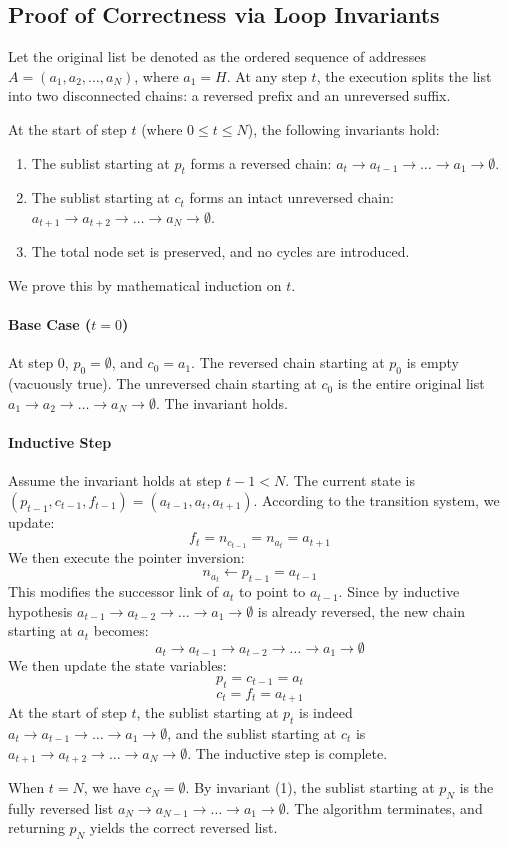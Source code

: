 \documentclass[10pt,journal,compsoc]{IEEEtran}
\begin{document}
\subsection{Proof of Correctness via Loop Invariants}
Let the original list be denoted as the ordered sequence of addresses $A = (a_1, a_2, \dots, a_N)$, where $a_1 = H$. At any step $t$, the execution splits the list into two disconnected chains: a reversed prefix and an unreversed suffix.
\begin{lemma}
At the start of step $t$ (where $0 \le t \le N$), the following invariants hold:
\begin{enumerate}
\item The sublist starting at $p_t$ forms a reversed chain: $a_t \to a_{t-1} \to \dots \to a_1 \to \emptyset$.
\item The sublist starting at $c_t$ forms an intact unreversed chain: $a_{t+1} \to a_{t+2} \to \dots \to a_N \to \emptyset$.
\item The total node set is preserved, and no cycles are introduced.
\end{enumerate}
\end{lemma}

\begin{IEEEproof}
We prove this by mathematical induction on $t$.
\paragraph{Base Case ($t=0$)}
At step $0$, $p_0 = \emptyset$, and $c_0 = a_1$. The reversed chain starting at $p_0$ is empty (vacuously true). The unreversed chain starting at $c_0$ is the entire original list $a_1 \to a_2 \to \dots \to a_N \to \emptyset$. The invariant holds.

\paragraph{Inductive Step}
Assume the invariant holds at step $t-1 < N$. The current state is $(p_{t-1}, c_{t-1}, f_{t-1}) = (a_{t-1}, a_t, a_{t+1})$. 
According to the transition system, we update:
\[ f_t = n_{c_{t-1}} = n_{a_t} = a_{t+1} \]
We then execute the pointer inversion:
\[ n_{a_t} \leftarrow p_{t-1} = a_{t-1} \]
This modifies the successor link of $a_t$ to point to $a_{t-1}$. Since by inductive hypothesis $a_{t-1} \to a_{t-2} \to \dots \to a_1 \to \emptyset$ is already reversed, the new chain starting at $a_t$ becomes:
\[ a_t \to a_{t-1} \to a_{t-2} \to \dots \to a_1 \to \emptyset \]
We then update the state variables:
\[ p_t = c_{t-1} = a_t \]
\[ c_t = f_t = a_{t+1} \]
At the start of step $t$, the sublist starting at $p_t$ is indeed $a_t \to a_{t-1} \to \dots \to a_1 \to \emptyset$, and the sublist starting at $c_t$ is $a_{t+1} \to a_{t+2} \to \dots \to a_N \to \emptyset$. The inductive step is complete.

When $t = N$, we have $c_N = \emptyset$. By invariant (1), the sublist starting at $p_N$ is the fully reversed list $a_N \to a_{N-1} \to \dots \to a_1 \to \emptyset$. The algorithm terminates, and returning $p_N$ yields the correct reversed list.
\end{IEEEproof}
\end{document}
